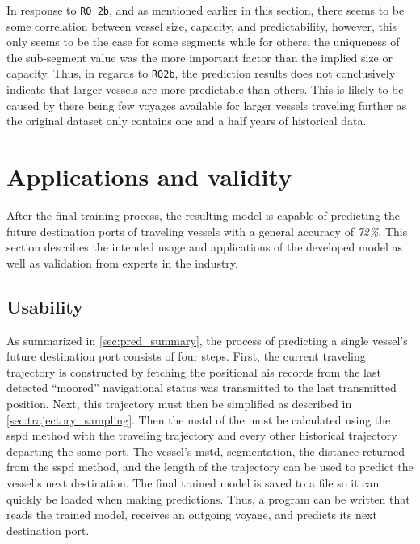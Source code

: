 In response to \texttt{RQ 2b}, and as mentioned earlier in this section, there seems to be some correlation between vessel size, capacity, and predictability, however, this only seems to be the case for some segments while for others, the uniqueness of the sub-segment value was the more important factor than the implied size or capacity. Thus, in regards to \texttt{RQ2b}, the prediction results does not conclusively indicate that larger vessels are more predictable than others. This is likely to be caused by there being few voyages available for larger vessels traveling further as the original dataset only contains one and a half years of historical data.

\section{Applications and validity}

After the final training process, the resulting model is capable of predicting the future destination ports of traveling vessels with a general accuracy of \textit{72\%}. This section describes the intended usage and applications of the developed model as well as validation from experts in the industry.

\subsection{Usability}
\label{sec:usability}

As summarized in \cref{sec:pred_summary}, the process of predicting a single vessel's future destination port consists of four steps. First, the current traveling trajectory is constructed by fetching the positional \acrshort{ais} records from the last detected ``moored'' navigational status was transmitted to the last transmitted position. Next, this trajectory must then be simplified as described in \cref{sec:trajectory_sampling}. Then the \acrfull{mstd} of the must be calculated using the \acrshort{sspd} method with the traveling trajectory and every other historical trajectory departing the same port. The vessel's \acrshort{mstd}, segmentation, the distance returned from the \acrshort{sspd} method, and the length of the trajectory can be used to predict the vessel's next destination. The final trained model is saved to a file so it can quickly be loaded when making predictions. Thus, a program can be written that reads the trained model, receives an outgoing voyage, and predicts its next destination port.

